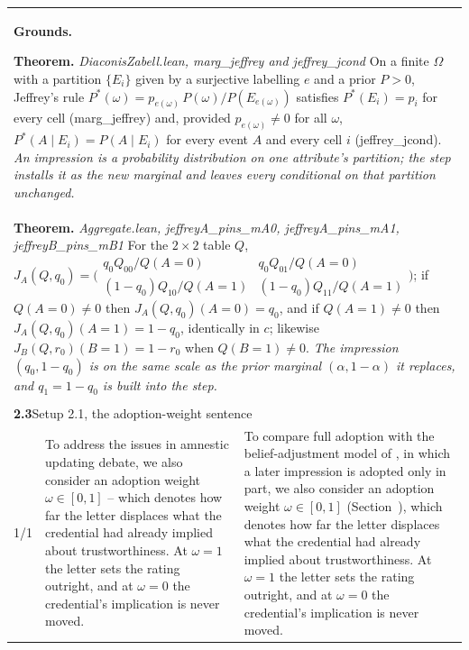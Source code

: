 \documentclass[10pt]{article}
\theoremstyle{definition}
\renewcommand{\ref}[1]{\textsc{\detokenize{#1}}}
\newlength{\fullw}\setlength{\fullw}{25.9cm}
\newcommand{\entryhead}[2]{\multicolumn{3}{|l|}{\rule{0pt}{2.6ex}\large\textbf{#1}\quad #2} \\ \hline}
\begin{document}
{\begin{longtable}{|p{0.9cm}|p{12.2cm}|p{12.2cm}|}
\multicolumn{3}{|p{\fullw}|}{\textbf{Grounds.}\par \textbf{Theorem.} \textit{DiaconisZabell.lean, marg\_jeffrey and jeffrey\_jcond} \newline On a finite $\Omega$ with a partition $\{E_i\}$ given by a surjective labelling
$e$ and a prior $P>0$, Jeffrey's rule $P^*(\omega)=p_{e(\omega)}\,P(\omega)/P(E_{e(\omega)})$
satisfies $P^*(E_i)=p_i$ for every cell (marg\_jeffrey) and, provided
$p_{e(\omega)}\neq0$ for all $\omega$, $P^*(A\mid E_i)=P(A\mid E_i)$ for every event $A$
and every cell $i$ (jeffrey\_jcond). \newline \textit{An impression is a probability distribution on one attribute's partition; the step
installs it as the new marginal and leaves every conditional on that partition unchanged.}} \\
\multicolumn{3}{|p{\fullw}|}{\textbf{Theorem.} \textit{Aggregate.lean, jeffreyA\_pins\_mA0, jeffreyA\_pins\_mA1, jeffreyB\_pins\_mB1} \newline For the $2\times2$ table $Q$,
$J_A(Q,q_0)=\bigl(\begin{smallmatrix} q_0Q_{00}/Q(A{=}0) & q_0Q_{01}/Q(A{=}0)\\
(1-q_0)Q_{10}/Q(A{=}1) & (1-q_0)Q_{11}/Q(A{=}1)\end{smallmatrix}\bigr)$; if $Q(A{=}0)\neq0$
then $J_A(Q,q_0)(A{=}0)=q_0$, and if $Q(A{=}1)\neq0$ then $J_A(Q,q_0)(A{=}1)=1-q_0$,
identically in $c$; likewise $J_B(Q,r_0)(B{=}1)=1-r_0$ when $Q(B{=}1)\neq0$. \newline \textit{The impression $(q_0,1-q_0)$ is on the same scale as the prior marginal
$(\alpha,1-\alpha)$ it replaces, and $q_1=1-q_0$ is built into the step.}} \\ \hline
\multicolumn{3}{|l|}{} \\ \hline
\entryhead{2.3}{Setup 2.1, the adoption-weight sentence\quad{\footnotesize\textit{(formerly C.9w)}}}
1/1 & To address the issues in amnestic updating debate, we also consider an adoption weight $\omega\in[0,1]$ -- which denotes how far the letter displaces what the credential had already implied about trustworthiness. At $\omega=1$ the letter sets the rating outright, and at $\omega=0$ the credential's implication is never moved. & To compare full adoption with the belief-adjustment model of \citet{HogarthEinhorn1992}, in which a later impression is adopted only in part, we also consider an adoption weight $\omega\in[0,1]$ (Section~\ref{sec:robust}), which denotes how far the letter displaces what the credential had already implied about trustworthiness. At $\omega=1$ the letter sets the rating outright, and at $\omega=0$ the credential's implication is never moved. \\ \hline

\end{longtable}}
\end{document}
